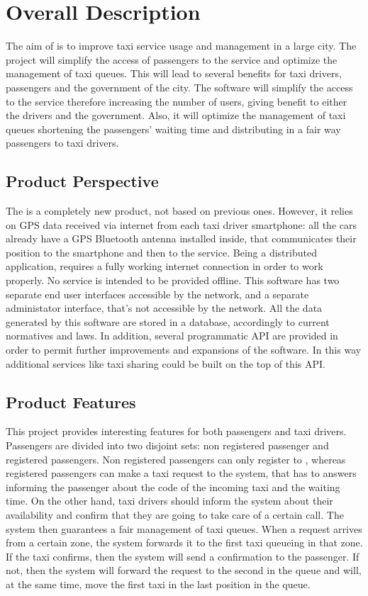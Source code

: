\section{Overall Description}
The aim of \myTaxiService{} is to improve taxi service usage and management in a large city.
The project will simplify the access of passengers to the service and optimize the management of taxi queues.
This will lead to several benefits for taxi drivers, passengers and the government of the city.
The software will simplify the access to the service therefore increasing the number of users, giving benefit to either the drivers and the government.
Also, it will optimize the management of taxi queues shortening the passengers’ waiting time and distributing in a fair way passengers to taxi drivers.
\subsection{Product Perspective}
The \myTaxiService{} is a completely new product, not based on previous ones.
However, it relies on GPS data received via internet from each taxi driver smartphone: all the cars already have a GPS Bluetooth antenna installed inside, that communicates their position to the smartphone and then to the service.
Being a distributed application, \myTaxiService{} requires a fully working internet connection in order to work properly.
No service is intended to be provided offline.
This software has two separate end user interfaces accessible by the network, and a separate administator interface, that's not accessible by the network.
All the data generated by this software are stored in a database, accordingly to current normatives and laws.
In addition, several programmatic API are provided in order to permit further improvements and expansions of the software.
In this way additional services like taxi sharing could be built on the top of this API.
\subsection{Product Features}
This project provides interesting features for both passengers and taxi drivers.
Passengers are divided into two disjoint sets: non registered passenger and registered passengers.
Non registered passengers can only register to \myTaxiService{}, whereas registered passengers can make a taxi request to the system, that has to answers informing the passenger about the code of the incoming taxi and the waiting time.
On the other hand, taxi drivers should inform the system about their availability and confirm that they are going to take care of a certain call.
The system then guarantees a fair management of taxi queues.
When a request arrives from a certain zone, the system forwards it to the first taxi queueing in that zone.
If the taxi confirms, then the system will send a confirmation to the passenger.
If not, then the system will forward the request to the second in the queue and will, at the same time, move the first taxi in the last position in the queue.
